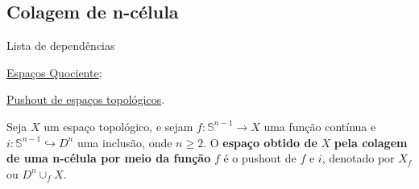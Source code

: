 \subsection{Colagem de n-célula} %
\label{colagem-de-n-celula-def}
\begin{titlemize}{Lista de dependências}
	\item \hyperref[topologia-quociente-def]{Espaços Quociente};\\
    \item \hyperref[pushout-de-espacos-topologicos-def]{Pushout de espaços topológicos}.%
\end{titlemize}

\begin{defi}
    Seja $X$ um espaço topológico, e sejam $f:\mathbb{S}^{n-1}\rightarrow X$ uma função contínua e $i:\mathbb{S}^{n-1}\hookrightarrow D^n$ uma inclusão, onde $n\ge 2$. O \textbf{espaço obtido de} $X$ \textbf{pela colagem de uma n-célula por meio da função } $f$ é o pushout de $f$ e $i$, denotado por $X_f$ ou $D^n\cup_f X$.
\end{defi}

